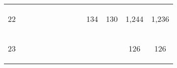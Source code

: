 \begin{center}
\begin{tabular}{lcccccccccccc}
22 & \begin{bf}\end{bf} & \begin{rm}\end{rm} & \begin{bf}\end{bf} & \begin{rm}\end{rm} & \begin{bf}\end{bf} & \begin{rm}\end{rm} & \begin{bf}\end{bf} & \begin{rm}\end{rm} & \begin{bf}134\end{bf} & \begin{rm}130\end{rm} & \begin{bf}1,244\end{bf} & \begin{rm}1,236\end{rm}\\
23 & \begin{bf}\end{bf} & \begin{rm}\end{rm} & \begin{bf}\end{bf} & \begin{rm}\end{rm} & \begin{bf}\end{bf} & \begin{rm}\end{rm} & \begin{bf}\end{bf} & \begin{rm}\end{rm} & \begin{bf}\end{bf} & \begin{rm}\end{rm} & \begin{bf}126\end{bf} & \begin{rm}126\end{rm}\\

\end{tabular}
\end{center}
